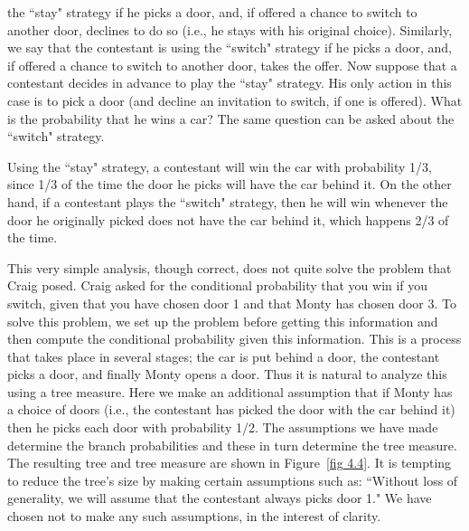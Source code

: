 \begin{example}
the ``stay" strategy if he picks a door, and, if offered a chance to switch to another door,
declines to do so (i.e., he stays with his original choice).  Similarly, we say that the
contestant is using the ``switch" strategy if he picks a door, and, if offered a chance to switch to
another door, takes the offer.  Now suppose that a contestant decides in advance to play the
``stay" strategy.  His only action in this case is to pick a door (and decline an invitation to
switch, if one is offered).  What is the probability that he wins a car?  The same
question can be asked about the ``switch" strategy.  
\par
Using the ``stay" strategy, a contestant will win the car with probability 1/3, since 1/3 of the
time the door he picks will have the car behind it.  On the other hand, if a contestant plays
the ``switch" strategy, then he will win whenever the door he originally picked does not have
the car behind it, which happens 2/3 of the time.  
\par
This very simple analysis, though correct, does not quite solve the problem that Craig posed.  Craig
asked for the conditional probability that you win if you switch, given that you have chosen door 1
and that Monty has chosen door 3.  To solve this problem, we set up the problem before
getting this information and then compute the conditional probability given this information. 
This is a process that takes place in several stages; the car is put behind a door, the contestant
picks a door, and finally  Monty opens a door.  Thus it is natural to analyze this using a tree
measure.  Here we make an additional assumption that if Monty has a choice of doors (i.e., the
contestant has picked the door with the car behind it) then he picks each door with probability
1/2.  The assumptions we have made determine the branch probabilities and these in turn determine
the tree measure. The resulting tree and tree measure are shown in Figure~\ref{fig 4.4}.  It is tempting to
reduce the tree's size by making certain assumptions such as: ``Without loss of generality, we
will assume that the contestant always picks door 1."  We have chosen not to make any such
assumptions, in the interest of clarity.  


\end{example}
